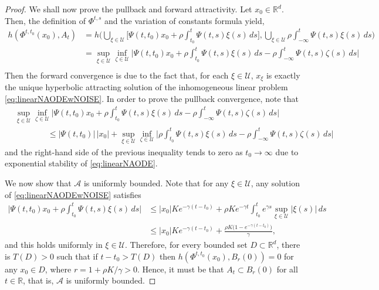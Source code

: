 \documentclass[reqno]{amsart}
\theoremstyle{definition}
\numberwithin{equation}{section}
\newcommand{\R}{\mathbb{R}}
\newcommand{\A}{\mathcal{A}}
\newcommand{\U}{\mathcal{U}}
\begin{document}
\begin{proof}
    We shall now prove the pullback and forward attractivity. Let $x_0\in\R^d$. Then, the definition of $\Phi^{t,s}$ and the variation of constants formula yield,
    \[
    \begin{split}
    h(\Phi^{t,t_0}(x_0), A_t)&= h\bigg(\bigcup_{\xi\in\U}\Big[\Psi(t,t_0)x_0 +\rho\int_{t_0}^t\Psi(t,s)\xi(s)\,ds\Big], \bigcup_{\xi\in\U}\rho\int_{-\infty}^t\Psi(t,s)\xi(s)\,ds\bigg)\\
    &=\sup_{\xi\in\U}\inf_{\zeta\in\U}\bigg|\Psi(t,t_0)x_0 +\rho\int_{t_0}^t\Psi(t,s)\xi(s)\,ds-\rho\int_{-\infty}^t\Psi(t,s)\zeta(s)\,ds\bigg|\\
    \end{split}
    \]
    Then the forward convergence is due to the fact that, for each $\xi\in\U$, $x_\xi$ is exactly the unique hyperbolic attracting solution of the inhomogeneous linear problem \eqref{eq:linearNAODEwNOISE}.
    In order to prove the pullback convergence, note that 
    \[
    \begin{split}
    &\sup_{\xi\in\U}\inf_{\zeta\in\U}\bigg|\Psi(t,t_0)x_0 +\rho\int_{t_0}^t\Psi(t,s)\xi(s)\,ds-\rho\int_{-\infty}^t\Psi(t,s)\zeta(s)\,ds\bigg|\\
    &\qquad\qquad\le |\Psi(t,t_0)|\,|x_0|+\sup_{\xi\in\U}\inf_{\zeta\in\U}\bigg|\rho\int_{t_0}^t\Psi(t,s)\xi(s)\,ds-\rho\int_{-\infty}^t\Psi(t,s)\zeta(s)\,ds\bigg|
    \end{split}
    \]
    and the right-hand side of the previous inequality tends to zero as $t_0\to\infty$ due to exponential stability of \eqref{eq:linearNAODE}. 
    
    We now show that $ \A$ is uniformly bounded. Note that for any $\xi\in\U$, any solution of \eqref{eq:linearNAODEwNOISE} satisfies 
    \[
    \begin{split}
    \bigg|\Psi(t,t_0)x_0 +\rho\int_{t_0}^t\Psi(t,s)\xi(s)\,ds\bigg|
    &\le |x_0|Ke^{-\gamma(t-t_0)}+\rho Ke^{-\gamma t}\int_{t_0}^te^{\gamma s}\sup_{\xi\in\U}|\xi(s)|\, ds \\  
    &\le |x_0|Ke^{-\gamma(t-t_0)}+\frac{\rho K \big(1-e^{-\gamma(t-t_0)}\big)}{\gamma},
    \end{split}
    \]
    and this holds uniformly in $\xi\in \U$. Therefore, for every bounded set $D\subset \R^d$, there is $T(D) >0$ such that if $t-t_0>T(D)$ then $h(\Phi^{t,t_0} (x_0), B_r(0))=0$ for any $x_0\in D$, where $r=1+\rho K/ \gamma>0$. Hence, it must be that $A_t\subset B_{r}(0)$ for all $t\in\R$, that is, $\A$ is uniformly bounded. \smallskip


\end{proof}
\end{document}
